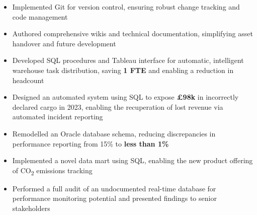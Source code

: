 \begin{paracol}{2}
\begin{itemize}
			\item Implemented Git for version control, ensuring robust change tracking and code management

			\item Authored comprehensive wikis and technical documentation, simplifying asset handover and
				future development

			\medskip
        
			      
		\end{itemize}

		\divider

		\begin{itemize}
			\item Developed SQL procedures and Tableau interface for automatic, intelligent warehouse task
				distribution, saving \textbf{1 FTE} and enabling a reduction in headcount

			\item Designed an automated system using SQL to expose \textbf{£98k} in incorrectly declared
				cargo in 2023, enabling the recuperation of lost revenue via automated incident reporting

			\item Remodelled an Oracle database schema, reducing discrepancies in performance reporting
				from 15\% to \textbf{less than 1\%}

			\item Implemented a novel data mart using SQL, enabling the new product offering of CO\textsubscript{2}
				emissions tracking

			\item Performed a full audit of an undocumented real-time database for performance monitoring potential
				and presented findings to senior stakeholders

			\medskip

			   
		\end{itemize}


\end{paracol}
